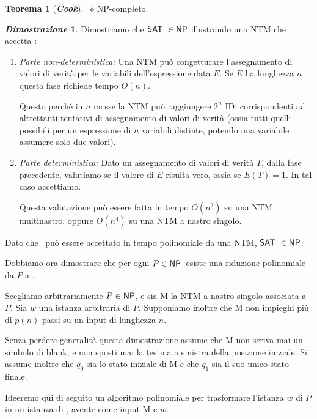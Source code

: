 \documentclass[12pt]{article}
\theoremstyle{definition}
\newtheorem*{mytheo}{Teorema}
\newtheorem*{myproof}{\em Dimostrazione}
\begin{document}
\begin{mytheo}[\textbf{\textit{Cook}}]
\SAT\ \`e NP-completo.
\end{mytheo}

\begin{myproof}
Dimostriamo che \({\mathsf{SAT}}\ \in {\ensuremath{\mathsf{NP}}}\) illustrando una NTM che accetta \SAT:

\begin{enumerate}
  \item \textit{Parte non-deterministica:}
    Una NTM pu\`o congetturare l'assegnamento di valori di verit\`a per le variabili dell'espressione data \(E\).
    Se \(E\) ha lunghezza \(n\) questa fase richiede tempo \(O(n)\).

    Questo perch\`e in \(n\) mosse la NTM pu\`o raggiungere \(2^n\) ID, corrispondenti ad altrettanti tentativi di assegnamento di valori di verit\`a
    (ossia tutti quelli possibili per un espressione di \(n\) variabili distinte, potendo una variabile assumere solo due valori).\newline
  
  \item \textit{Parte deterministica:}
    Dato un assegnamento di valori di verit\`a \(T\), dalla fase precedente, valutiamo se il valore di \(E\) risulta vero, ossia se \(E(T)=1\).
    In tal caso accettiamo.
    
    Questa valutazione pu\`o essere fatta in tempo \(O(n^2)\) su una NTM multinastro, oppure \(O(n^4)\) su una NTM a nastro singolo.
\end{enumerate}

Dato che \SAT\ pu\`o essere accettato in tempo polinomiale da una NTM, \({\mathsf{SAT}}\ \in {\ensuremath{\mathsf{NP}}}\).

Dobbiamo ora dimostrare che per ogni \(P \in {\ensuremath{\mathsf{NP}}}\)\ esiste una riduzione polinomiale da \(P\) a \SAT.

Scegliamo arbitrariamente \(P \in {\ensuremath{\mathsf{NP}}}\), e sia M la NTM a nastro singolo associata a \(P\).
Sia \(w\) una istanza arbitraria di \(P\).
Supponiamo inoltre che M non impieghi pi\`u di \(p(n)\) passi su un input di lunghezza \(n\).

Senza perdere generalit\`a questa dimostrazione assume che M non scriva mai un simbolo di blank,
e non sposti mai la testina a sinistra della posizione iniziale. Si assume inoltre che \(q_0\) sia lo stato
iniziale di M e che \(q_1\) sia il suo unico stato finale.

Ideeremo qui di seguito un algoritmo polinomiale per trasformare l'istanza \(w\) di \(P\) in un
istanza di \SAT, avente come input M e \(w\).


\end{myproof}
\end{document}

